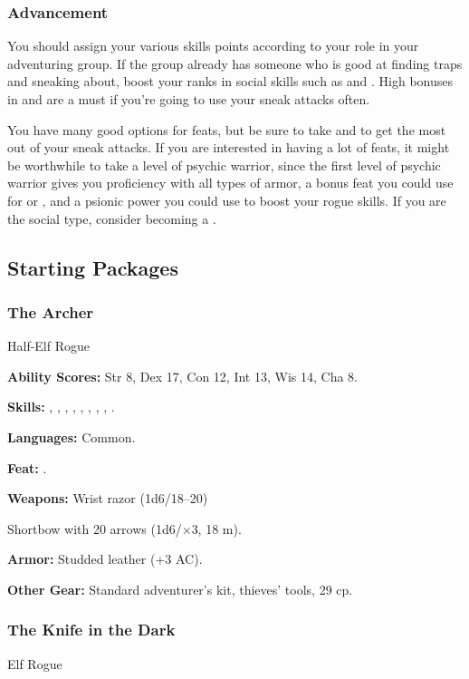\subsubsection{Advancement}
You should assign your various skills points according to your role in your adventuring group. If the group already has someone who is good at finding traps and sneaking about, boost your ranks in social skills such as  and . High bonuses in  and  are a must if you're going to use your sneak attacks often.

You have many good options for feats, but be sure to take  and  to get the most out of your sneak attacks. If you are interested in having a lot of feats, it might be worthwhile to take a level of psychic warrior, since the first level of psychic warrior gives you proficiency with all types of armor, a bonus feat you could use for  or , and a psionic power you could use to boost your rogue skills. If you are the social type, consider becoming a .

\subsection{Starting Packages}
\subsubsection{The Archer}
Half-Elf Rogue

\textbf{Ability Scores:} Str 8, Dex 17, Con 12, Int 13, Wis 14, Cha 8.

\textbf{Skills:} , , , , , , , , .

\textbf{Languages:} Common.

\textbf{Feat:} .

\textbf{Weapons:} Wrist razor (1d6/18--20)

Shortbow with 20 arrows (1d6/$\times$3, 18 m).

\textbf{Armor:} Studded leather (+3 AC).

\textbf{Other Gear:} Standard adventurer's kit, thieves' tools, 29 cp.

\subsubsection{The Knife in the Dark}
Elf Rogue

